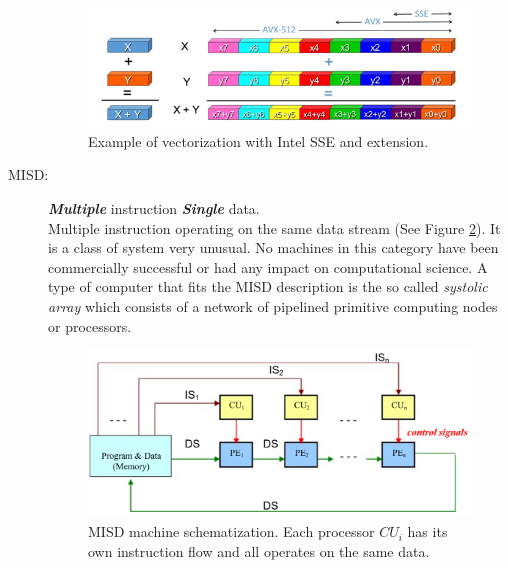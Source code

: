 \begin{description}
\begin{figure}[!htbp]
	\centering
	\includegraphics[width=1.0\textwidth]{./images/parallel_programming/vectorization_example}
	\caption{Example of vectorization with Intel SSE and extension.}
	\label{fig:SSEvectorization}
\end{figure}

\item[MISD:] \textit{\textbf{Multiple}} instruction \textit{\textbf{Single}} data. \hfill \\ 
Multiple instruction operating on the same data stream  (See Figure \ref{fig:MISD}). It is a class of system very unusual. No machines in this category have been commercially successful or had any impact on computational science. 
A type of computer  that fits the MISD description is the so called \textit{systolic array} \cite{fortes:1987,kung:1984} which consists of a network of pipelined primitive computing nodes or processors. 
\begin{figure}[!htbp]
	\centering
	\includegraphics[width=1.0\textwidth]{./images/parallel_programming/MISD}
	\caption{MISD machine schematization. Each processor $CU_i$ has its own instruction flow and all operates on the same data.}
	\label{fig:MISD}
\end{figure}
 

\end{description}
